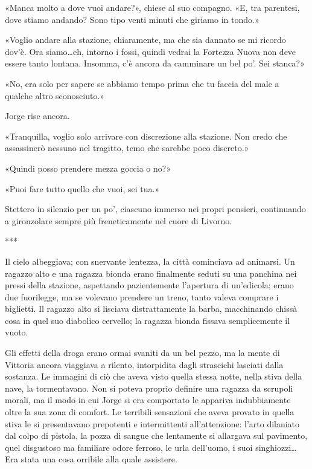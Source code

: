«Manca molto a dove vuoi andare?», chiese al suo compagno. «E, tra parentesi, dove stiamo andando? Sono tipo venti minuti che giriamo in tondo.»

«Voglio andare alla stazione, chiaramente, ma che sia dannato se mi ricordo dov'è. Ora siamo\ldots eh, intorno i fossi, quindi vedrai la Fortezza Nuova non deve essere tanto lontana. Insomma, c'è ancora da camminare un bel po'. Sei stanca?»

«No, era solo per sapere se abbiamo tempo prima che tu faccia del male a qualche altro sconosciuto.»

Jorge rise ancora.

«Tranquilla, voglio solo arrivare con discrezione alla stazione. Non credo che assassinerò nessuno nel tragitto, temo che sarebbe poco discreto.»

«Quindi posso prendere mezza goccia o no?»

«Puoi fare tutto quello che vuoi, sei tua.»

Stettero in silenzio per un po', ciascuno immerso nei propri pensieri, continuando a gironzolare sempre più freneticamente nel cuore di Livorno.

***

Il cielo albeggiava; con snervante lentezza, la città cominciava ad animarsi. Un ragazzo alto e una ragazza bionda erano finalmente seduti su una panchina nei pressi della stazione, aspettando pazientemente l'apertura di un'edicola; erano due fuorilegge, ma se volevano prendere un treno, tanto valeva comprare i biglietti. Il ragazzo alto si lisciava distrattamente la barba, macchinando chissà cosa in quel suo diabolico cervello; la ragazza bionda fissava semplicemente il vuoto.

Gli effetti della droga erano ormai svaniti da un bel pezzo, ma la mente di Vittoria ancora viaggiava a rilento, intorpidita dagli strascichi lasciati dalla sostanza. Le immagini di ciò che aveva visto quella stessa notte, nella stiva della nave, la tormentavano. Non si poteva proprio definire una ragazza da scrupoli morali, ma il modo in cui Jorge si era comportato le appariva indubbiamente oltre la sua zona di comfort. Le terribili sensazioni che aveva provato in quella stiva le si presentavano prepotenti e intermittenti all'attenzione: l'arto dilaniato dal colpo di pistola, la pozza di sangue che lentamente si allargava sul pavimento, quel disgustoso ma familiare odore ferroso, le urla dell'uomo, i suoi singhiozzi\ldots Era stata una cosa orribile alla quale assistere.

